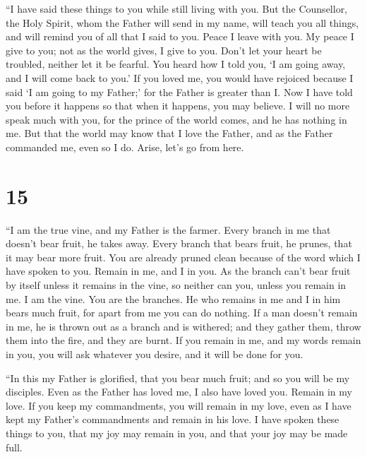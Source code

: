  ``I have said these things to you while still living with
you.  But the Counsellor, the Holy Spirit, whom the Father
will send in my name, will teach you all things, and will remind you of
all that I said to you.  Peace I leave with you. My peace I
give to you; not as the world gives, I give to you. Don't let your heart
be troubled, neither let it be fearful.  You heard how I
told you, `I am going away, and I will come back to you.' If you loved
me, you would have rejoiced because I said `I am going to my Father;'
for the Father is greater than I.  Now I have told you
before it happens so that when it happens, you may believe.
 I will no more speak much with you, for the prince of the
world comes, and he has nothing in me.  But that the world
may know that I love the Father, and as the Father commanded me, even so
I do. Arise, let's go from here.

\hypertarget{section-14}{%
\section{15}\label{section-14}}

 ``I am the true vine, and my Father is the farmer.
 Every branch in me that doesn't bear fruit, he takes away.
Every branch that bears fruit, he prunes, that it may bear more fruit.
 You are already pruned clean because of the word which I
have spoken to you.  Remain in me, and I in you. As the
branch can't bear fruit by itself unless it remains in the vine, so
neither can you, unless you remain in me.  I am the vine.
You are the branches. He who remains in me and I in him bears much
fruit, for apart from me you can do nothing.  If a man
doesn't remain in me, he is thrown out as a branch and is withered; and
they gather them, throw them into the fire, and they are burnt.
 If you remain in me, and my words remain in you, you will
ask whatever you desire, and it will be done for you.

 ``In this my Father is glorified, that you bear much fruit;
and so you will be my disciples.  Even as the Father has
loved me, I also have loved you. Remain in my love.  If you
keep my commandments, you will remain in my love, even as I have kept my
Father's commandments and remain in his love.  I have
spoken these things to you, that my joy may remain in you, and that your
joy may be made full.

